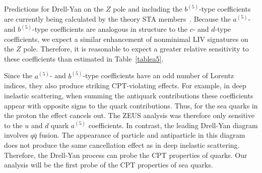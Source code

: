 Predictions for Drell-Yan on the $Z$ pole and including the
$b^{(5)}$-type coefficients are currently being calculated by
the theory STA members~\cite{LS24}. Because the $a^{(5)}$-
and $b^{(5)}$-type coefficients are analogous in structure to the
$c$- and $d$-type coefficients, we expect a similar enhancement
of nonminimal LIV signatures on the $Z$ pole. Therefore, it is reasonable
to expect a greater relative sensitivity to these coefficients
than estimated in Table~\ref{tablea5}. 

Since the $a^{(5)}$- and $b^{(5)}$-type coefficients have an odd number
of Lorentz indices, they also produce striking CPT-violating effects.
For example, in deep inelastic scattering, when summing
the antiquark contributions these coefficients appear with opposite
signs to the quark contributions. Thus, for the sea quarks in the proton
the effect cancels out. The ZEUS analysis was therefore only sensitive
to the $u$ and $d$ quark $a^{(5)}$ coefficients. In contrast,
the leading Drell-Yan diagram involves $q\bar q$ fusion. The appearance
of particle and antiparticle in this diagram does not
produce the same cancellation effect as in deep inelastic scattering. 
Therefore, the Drell-Yan process can probe the CPT properties
of quarks. Our analysis will be the first probe of the CPT 
properties of sea quarks.



